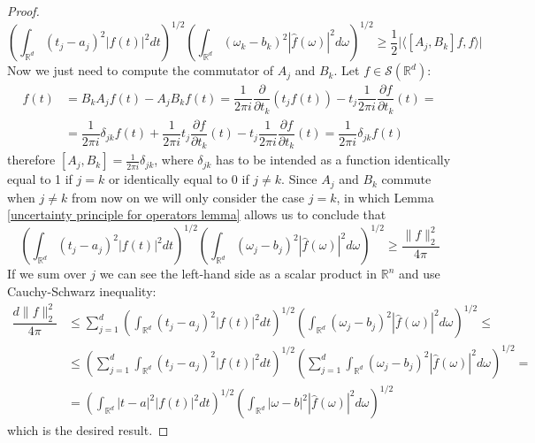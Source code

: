 \documentclass[corpo=11pt, stile=classica, tipotesi=custom,
greek, evenboxes, english]{toptesi}
\numberwithin{equation}{chapter}
\theoremstyle{remark}
\newcommand{\R}{\mathbb{R}} %
\newcommand{\pdfrac}[2]{\dfrac{\partial #1}{\partial #2}}
\begin{document}
\begin{proof}
	\begin{equation*}
		\left(\int_{\R^d}(t_j-a_j)^2 |f(t)|^2 dt\right)^{1/2} \left(\int_{\R^d} (\omega_k-b_k)^2 |\hat{f}(\omega)|^2 d\omega\right)^{1/2} \geq \dfrac12\lvert\langle [A_j,B_k]f,f \rangle \rvert
	\end{equation*}
	Now we just need to compute the commutator of $A_j$ and $B_k$. Let $f \in \mathcal{S}(\R^d)$:
	\begin{align*}
		[A_j,B_k]f(t) &= B_kA_jf(t)-A_jB_kf(t) = \dfrac{1}{2\pi i}\pdfrac{}{t_k}(t_jf(t)) - t_j \dfrac{1}{2\pi i}\pdfrac{f}{t_k}(t) =\\
				  &= \dfrac{1}{2\pi i}\delta_{jk} f(t) + \dfrac{1}{2\pi i} t_j \pdfrac{f}{t_k}(t) - t_j \dfrac{1}{2\pi i}\pdfrac{f}{t_k}(t) = \dfrac{1}{2\pi i}\delta_{jk} f(t)
	\end{align*}
	therefore $[A_j,B_k] = \frac{1}{2\pi i}\delta_{jk}$, where $\delta_{jk}$ has to be intended as a function identically equal to 1 if $j=k$ or identically equal to 0 if $j \neq k$. Since $A_j$ and $B_k$ commute when $j \neq k$ from now on we will only consider the case $j=k$, in which Lemma \ref{uncertainty principle for operators lemma} allows us to conclude that
	\begin{equation}\label{Heisenberg's uncertainty principle formula componentwise}
		\left(\int_{\R^d}(t_j-a_j)^2 |f(t)|^2 dt\right)^{1/2} \left(\int_{\R^d} (\omega_j-b_j)^2 |\hat{f}(\omega)|^2 d\omega\right)^{1/2} \geq \dfrac{\|f\|_2^2}{4\pi}
	\end{equation}
	If we sum over $j$ we can see the left-hand side as a scalar product in $\R^n$ and use Cauchy-Schwarz inequality:
	\begin{align}
		\dfrac{d \|f\|_2^2}{4\pi} &\leq \sum_{j=1}^{d}\left(\int_{\R^d}(t_j-a_j)^2 |f(t)|^2 dt\right)^{1/2} \left(\int_{\R^d} (\omega_j-b_j)^2 |\hat{f}(\omega)|^2 d\omega\right)^{1/2} \leq\label{Heisenberg's uncertainty principle Cauchy Schwarz in Rd}\\
								  &\leq \left(\sum_{j=1}^{d} \int_{\R^d}(t_j-a_j)^2 |f(t)|^2 dt \right)^{1/2} \left(\sum_{j=1}^{d} \int_{\R^d} (\omega_j-b_j)^2 |\hat{f}(\omega)|^2 d\omega \right)^{1/2}=\nonumber\\
								  &= \left(\int_{\R^d}|t-a|^2 |f(t)|^2 dt\right)^{1/2} \left(\int_{\R^d} |\omega-b|^2 |\hat{f}(\omega)|^2 d\omega\right)^{1/2}\nonumber
	\end{align}
	which is the desired result.
	

\end{proof}
\end{document}
